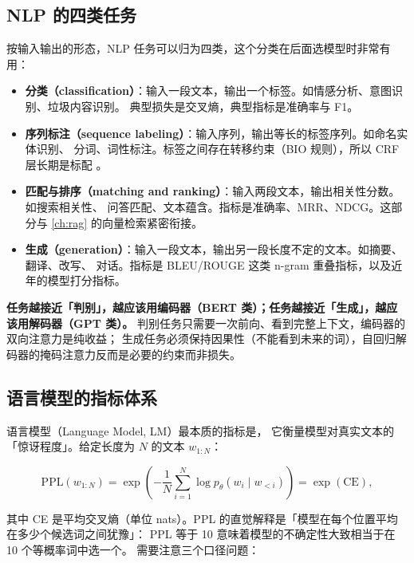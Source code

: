 \subsection{NLP 的四类任务}

按输入输出的形态，NLP 任务可以归为四类，这个分类在后面选模型时非常有用：

\begin{itemize}
  \item \textbf{分类（classification）}：输入一段文本，输出一个标签。如情感分析、意图识别、垃圾内容识别。
        典型损失是交叉熵，典型指标是准确率与 F1。
  \item \textbf{序列标注（sequence labeling）}：输入序列，输出等长的标签序列。如命名实体识别、
        分词、词性标注。标签之间存在转移约束（BIO 规则），所以 CRF 层长期是标配 \cite{lafferty2001crf}。
  \item \textbf{匹配与排序（matching and ranking）}：输入两段文本，输出相关性分数。如搜索相关性、
        问答匹配、文本蕴含。指标是准确率、MRR、NDCG。这部分与 \cref{ch:rag} 的向量检索紧密衔接。
  \item \textbf{生成（generation）}：输入一段文本，输出另一段长度不定的文本。如摘要、翻译、改写、
        对话。指标是 BLEU/ROUGE 这类 n-gram 重叠指标，以及近年的模型打分指标。
\end{itemize}

\begin{keypoint}[一个反复出现的判断法则]
\textbf{任务越接近「判别」，越应该用编码器（BERT 类）；任务越接近「生成」，越应该用解码器（GPT 类）。}
判别任务只需要一次前向、看到完整上下文，编码器的双向注意力是纯收益；
生成任务必须保持因果性（不能看到未来的词），自回归解码器的掩码注意力反而是必要的约束而非损失。
\end{keypoint}

\subsection{语言模型的指标体系}

语言模型（Language Model, LM）最本质的指标是，
它衡量模型对真实文本的「惊讶程度」。给定长度为 $N$ 的文本 $w_{1:N}$：

\begin{equation}
\text{PPL}(w_{1:N}) = \exp\!\left( -\frac{1}{N} \sum_{i=1}^{N} \log p_\theta(w_i \mid w_{<i}) \right)
= \exp(\text{CE}) ,
\label{eq:ppl}
\end{equation}

其中 CE 是平均交叉熵（单位 nats）。PPL 的直觉解释是「模型在每个位置平均在多少个候选词之间犹豫」：
PPL 等于 10 意味着模型的不确定性大致相当于在 10 个等概率词中选一个。
需要注意三个口径问题：

